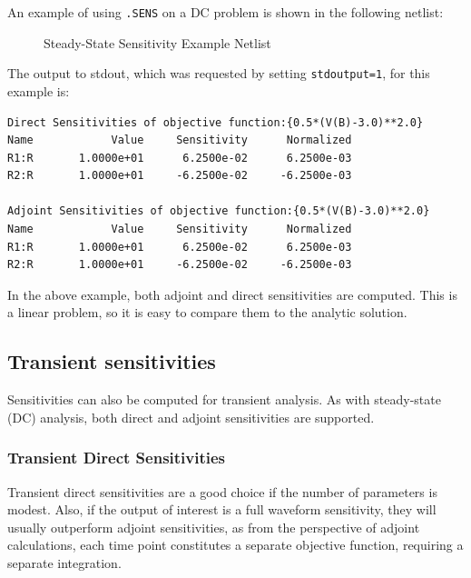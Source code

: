 An example of using \texttt{.SENS} on a DC problem is shown in the following netlist:
\begin{figure}[htbp]
  \begin{centering}
\caption[Steady-State Sensitivity Example Netlist]
{Steady-State Sensitivity Example Netlist \label{DC_Sensitivity_Netlist} }
\end{centering}
\end{figure}
The output to stdout, which was requested by setting \texttt{stdoutput=1}, for this example is:
\begin{verbatim}
Direct Sensitivities of objective function:{0.5*(V(B)-3.0)**2.0}
Name	        Value	  Sensitivity	   Normalized
R1:R	   1.0000e+01	   6.2500e-02	   6.2500e-03
R2:R	   1.0000e+01	  -6.2500e-02	  -6.2500e-03

Adjoint Sensitivities of objective function:{0.5*(V(B)-3.0)**2.0}
Name	        Value	  Sensitivity	   Normalized
R1:R	   1.0000e+01	   6.2500e-02	   6.2500e-03
R2:R	   1.0000e+01	  -6.2500e-02	  -6.2500e-03
\end{verbatim}
In the above example, both adjoint and direct sensitivities are computed.  This is 
a linear problem, so it is easy to compare them to the analytic solution.
\subsection{Transient sensitivities}
Sensitivities can also be computed for transient analysis.  As with steady-state (DC) 
analysis, both direct and adjoint sensitivities are supported.

\subsubsection{Transient Direct Sensitivities}
Transient direct sensitivities are a good choice if the number of parameters is 
modest.  Also, if the output of interest is a full waveform sensitivity, they 
will usually outperform adjoint sensitivities, as from the perspective of 
adjoint calculations, each time point constitutes a separate objective function, 
requiring a separate integration.

